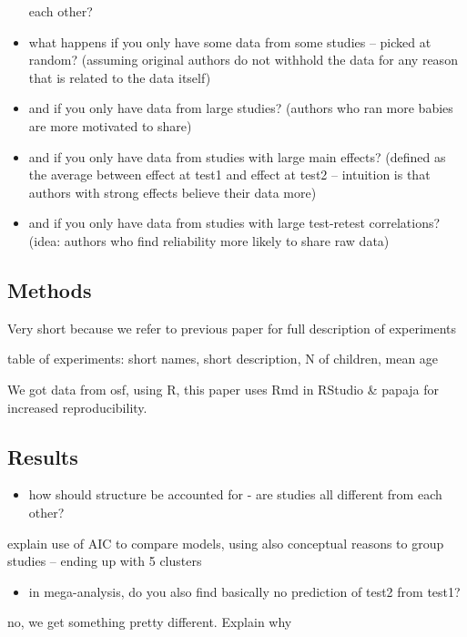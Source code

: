 \documentclass[man]{apa6}
\providecommand{\tightlist}{%
  \setlength{\itemsep}{0pt}\setlength{\parskip}{0pt}}
\begin{document}
\begin{itemize}
  each other?
\item
  what happens if you only have some data from some studies -- picked at
  random? (assuming original authors do not withhold the data for any
  reason that is related to the data itself)
\item
  and if you only have data from large studies? (authors who ran more
  babies are more motivated to share)
\item
  and if you only have data from studies with large main effects?
  (defined as the average between effect at test1 and effect at test2 --
  intuition is that authors with strong effects believe their data more)
\item
  and if you only have data from studies with large test-retest
  correlations? (idea: authors who find reliability more likely to share
  raw data)
\end{itemize}

\subsection{Methods}\label{methods}

Very short because we refer to previous paper for full description of
experiments

table of experiments: short names, short description, N of children,
mean age

We got data from osf, using R, this paper uses Rmd in RStudio \& papaja
for increased reproducibility.

\subsection{Results}\label{results}

\begin{itemize}
\tightlist
\item
  how should structure be accounted for - are studies all different from
  each other?
\end{itemize}

explain use of AIC to compare models, using also conceptual reasons to
group studies -- ending up with 5 clusters

\begin{itemize}
\tightlist
\item
  in mega-analysis, do you also find basically no prediction of test2
  from test1?
\end{itemize}

no, we get something pretty different. Explain why
\end{document}

